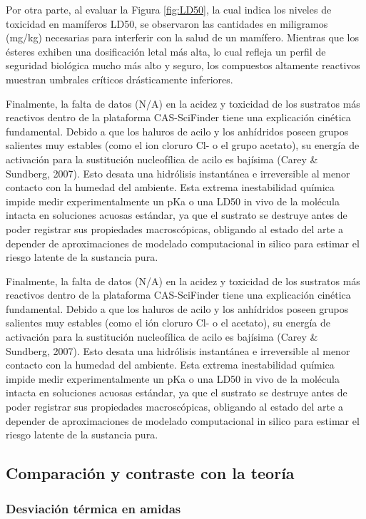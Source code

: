 \documentclass{article}
\begin{document}
Por otra parte, al evaluar la Figura \ref{fig:LD50}, la cual indica los niveles de toxicidad en mamíferos LD50, se observaron las cantidades en miligramos (mg/kg) necesarias para interferir con la salud de un mamífero. Mientras que los ésteres exhiben una dosificación letal más alta, lo cual refleja un perfil de seguridad biológica mucho más alto y seguro, los compuestos altamente reactivos muestran umbrales críticos drásticamente inferiores.

Finalmente, la falta de datos (N/A) en la acidez y toxicidad de los sustratos más reactivos dentro de la plataforma CAS-SciFinder tiene una explicación cinética fundamental. Debido a que los haluros de acilo y los anhídridos poseen grupos salientes muy estables (como el ion cloruro Cl- o el grupo acetato), su energía de activación para la sustitución nucleofílica de acilo es bajísima (Carey \& Sundberg, 2007). Esto desata una hidrólisis instantánea e irreversible al menor contacto con la humedad del ambiente. Esta extrema inestabilidad química impide medir experimentalmente un pKa o una LD50 in vivo de la molécula intacta en soluciones acuosas estándar, ya que el sustrato se destruye antes de poder registrar sus propiedades macroscópicas, obligando al estado del arte a depender de aproximaciones de modelado computacional in silico para estimar el riesgo latente de la sustancia pura.

Finalmente, la falta de datos (N/A) en la acidez y toxicidad de los sustratos más reactivos dentro de la plataforma CAS-SciFinder tiene una explicación cinética fundamental. Debido a que los haluros de acilo y los anhídridos poseen grupos salientes muy estables (como el ión cloruro Cl- o el acetato), su energía de activación para la sustitución nucleofílica de acilo es bajísima (Carey \& Sundberg, 2007). Esto desata una hidrólisis instantánea e irreversible al menor contacto con la humedad del ambiente. Esta extrema inestabilidad química impide medir experimentalmente un pKa o una LD50 in vivo de la molécula intacta en soluciones acuosas estándar, ya que el sustrato se destruye antes de poder registrar sus propiedades macroscópicas, obligando al estado del arte a depender de aproximaciones de modelado computacional in silico para estimar el riesgo latente de la sustancia pura.

\subsection{Comparación y contraste con la teoría}
\subsubsection{Desviación térmica en amidas}
\end{document}
